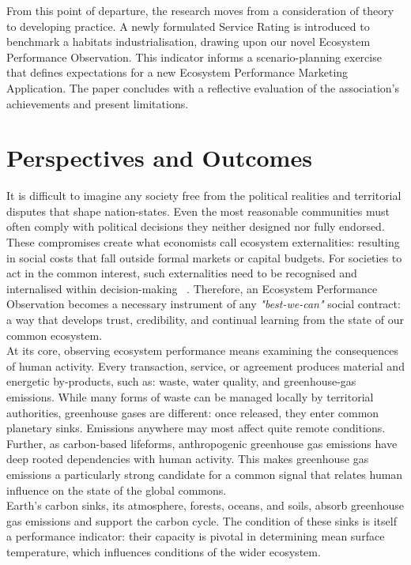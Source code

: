 \documentclass[10pt, oneside]{article}   	%
\begin{document}
From this point of departure, the research moves from a consideration of theory to developing practice.
A newly formulated Service Rating is introduced to benchmark a habitats industrialisation, drawing upon our novel Ecosystem Performance Observation.
This indicator informs a scenario-planning exercise that defines expectations for a new Ecosystem Performance Marketing Application.
The paper concludes with a reflective evaluation of the association's achievements and present limitations.\\

\section{Perspectives and Outcomes}

It is difficult to imagine any society free from the political realities and territorial disputes that shape nation-states.
Even the most reasonable communities must often comply with political decisions they neither designed nor fully endorsed.
These compromises create what economists call ecosystem externalities: resulting in social costs that fall outside formal markets or capital budgets.
For societies to act in the common interest, such externalities need to be recognised and internalised within decision-making ~\cite{rc1}.
Therefore, an Ecosystem Performance Observation becomes a necessary instrument of any \emph{"best-we-can"} social contract: a way that develops trust, credibility, and continual learning from the state of our common ecosystem.\\

At its core, observing ecosystem performance means examining the consequences of human activity.
Every transaction, service, or agreement produces material and energetic by-products, such as: waste, water quality, and greenhouse-gas emissions.
While many forms of waste can be managed locally by territorial authorities, greenhouse gases are different: once released, they enter common planetary sinks.
Emissions anywhere may most affect quite remote conditions.
Further, as carbon-based lifeforms, anthropogenic greenhouse gas emissions have deep rooted dependencies with human activity.
This makes greenhouse gas emissions a particularly strong candidate for a common signal that relates human influence on the state of the global commons.\\

Earth’s carbon sinks, its atmosphere, forests, oceans, and soils, absorb greenhouse gas emissions and support the carbon cycle.
The condition of these sinks is itself a performance indicator: their capacity is pivotal in determining mean surface temperature, which influences conditions of the wider ecosystem.\\
\end{document}
